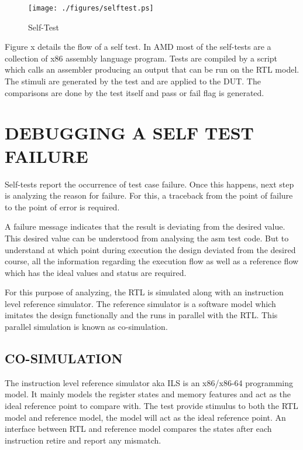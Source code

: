 \begin{figure}[H]
\centering
\texttt{[image: ./figures/selftest.ps]}
\caption{Self-Test} 
\label{fig:selftest.ps}
\end{figure}

Figure x details the flow of a self test. In AMD most of the self-tests are a collection of x86 assembly language program. Tests are compiled by a script which calls an assembler producing an output that can be run on the RTL model. The stimuli are generated by the test and are applied to the DUT. The comparisons are done by the test itself and pass or fail flag is generated. \\



\section{DEBUGGING A SELF TEST FAILURE}

Self-tests report the occurrence of test case failure. Once this happens, next step is analyzing the reason for failure.  For this, a traceback from the point of failure to the point of error is required. 

A failure message indicates that the result is deviating from the desired value. This desired value can be understood from analysing the asm test code. But to understand at which point during execution the design deviated from the desired course, all the information regarding the execution flow as well as a reference flow which has the ideal values and status are required.
 
For this purpose of analyzing, the RTL is simulated along with an instruction level reference simulator. The reference simulator is a software model which imitates the design functionally and the runs in parallel with the RTL. This parallel simulation is known as co-simulation. 


\subsection {CO-SIMULATION}
The instruction level reference simulator aka ILS is an x86/x86-64 programming model. It mainly models the register states and memory features and act as the ideal reference point to compare with. The test provide stimulus to both the RTL model and reference model, the model will act as the ideal reference point. An interface between RTL and reference model compares the states after each instruction retire and report any mismatch. 

